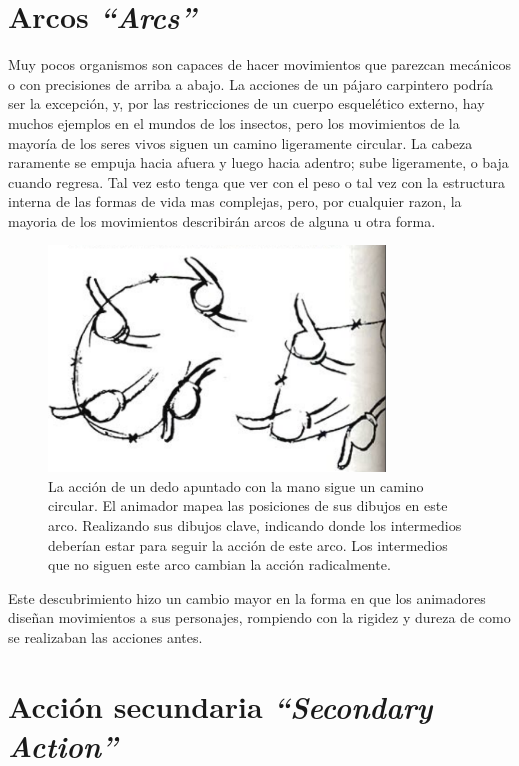 \documentclass[a4paper,12pt]{report}
\begin{document}
 
\section{Arcos \textit{``Arcs''}}
 
 
Muy pocos organismos son capaces de hacer movimientos que parezcan mecánicos o con precisiones de arriba a abajo.
La acciones de un pájaro carpintero podría ser la excepción, y, por las restricciones de un cuerpo esquelético externo, hay muchos ejemplos en el mundos de los insectos, pero los movimientos de la
mayoría de los seres vivos siguen un camino ligeramente circular. La cabeza raramente se empuja hacia afuera y luego hacia adentro; sube ligeramente, o baja cuando regresa.
Tal vez esto tenga que ver con el peso o tal vez con la estructura interna de las formas de vida mas complejas, pero, por cualquier razon, la mayoria de los movimientos describirán arcos de alguna u otra forma.\cite{principles_animation}
 

\begin{figure}[ht]
    \centering
    \includegraphics[height=6cm]{Imagenes/circular_hand}
    \caption{La acción de un dedo apuntado con la mano sigue un camino circular. El animador mapea
    las posiciones de sus dibujos en este arco. Realizando sus dibujos clave, indicando donde los intermedios deberían estar para
    seguir la acción de este arco. Los intermedios que no siguen este arco cambian la acción radicalmente.}
    \label{fig:circular_hand}
\end{figure}
 

Este descubrimiento hizo un cambio mayor en la forma en que los animadores diseñan movimientos a sus personajes,
rompiendo con la rigidez y dureza de como se realizaban las acciones antes.\cite{principles_animation}
 
 
\section{Acción secundaria \textit{``Secondary Action''}}
 
\end{document}
